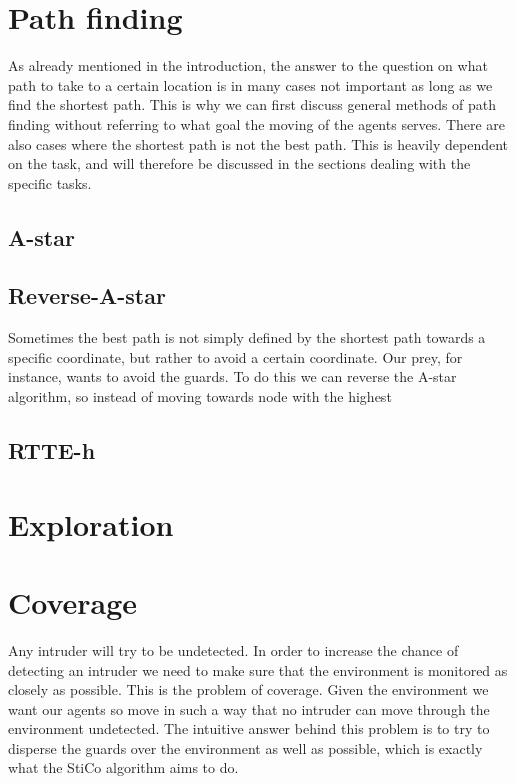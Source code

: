 \documentclass{apa6}
\begin{document}
\section{Path finding}
		As already mentioned in the introduction, the answer to the question on what path to take to a certain location is in many cases not important as long as we find the shortest path. This is why we can first discuss general methods of path finding without referring to what goal the moving of the agents serves. There are also cases where the shortest path is not the best path. This is heavily dependent on the task, and will therefore be discussed in the sections dealing with the specific tasks.

    \subsection{A-star}
		
		
	\subsection{Reverse-A-star}
	Sometimes the best path is not simply defined by the shortest path towards a specific coordinate, but rather to avoid a certain coordinate. Our prey, for instance, wants to avoid the guards. To do this we can reverse the A-star algorithm, so instead of moving towards node with the highest

	\subsection{RTTE-h}
		

	\section{Exploration}

	\section{Coverage}
	Any intruder will try to be undetected. In order to increase the chance of detecting an intruder we need to make sure that the environment is monitored as closely as possible. This is the problem of coverage. Given the environment we want our agents so move in such a way that no intruder can move through the environment undetected. The intuitive answer behind this problem is to try to disperse the guards over the environment as well as possible, which is exactly what the StiCo algorithm aims to do.
	
\end{document}

